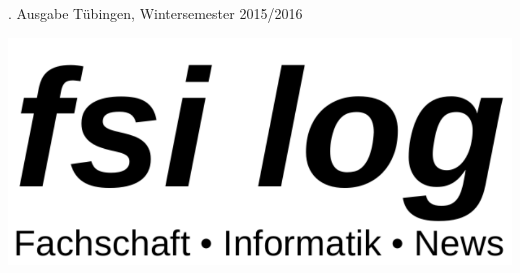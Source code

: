 \thispagestyle{empty}
{\sf \number\auflage. Ausgabe \hfill Tübingen, Wintersemester 2015/2016}%
\vspace{5cm}

\includegraphics[width=\textwidth]{logos/fsi-log-logo}


\begin{center}
%
%
%
%
\vfill
\end{center}
\eject